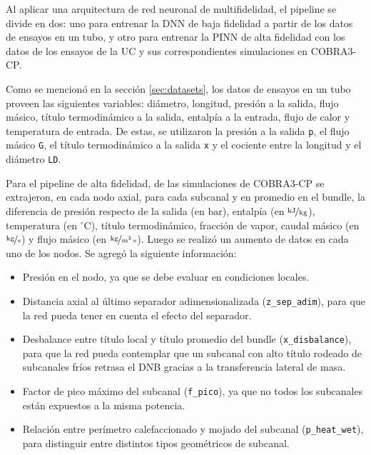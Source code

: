 Al aplicar una arquitectura de red neuronal de multifidelidad, el pipeline se divide en dos: uno para entrenar la DNN de baja fidelidad a partir de los datos de ensayos en un tubo, y otro para entrenar la PINN de alta fidelidad con los datos de los ensayos de la UC y sus correspondientes simulaciones en COBRA3-CP.

Como se mencionó en la sección \ref{sec:datasets}, los datos de ensayos en un tubo proveen las siguientes variables: diámetro, longitud, presión a la salida, flujo másico, título termodinámico a la salida, entalpía a la entrada, flujo de calor y temperatura de entrada. De estas, se utilizaron la presión a la salida \texttt{p}, el flujo másico \texttt{G}, el título termodinámico a la salida \texttt{x} y el cociente entre la longitud y el diámetro \texttt{LD}.

Para el pipeline de alta fidelidad, de las simulaciones de COBRA3-CP se extrajeron, en cada nodo axial, para cada subcanal y en promedio en el bundle, la diferencia de presión respecto de la salida (en $\mathrm{bar}$), entalpía (en $\nicefrac{\mathrm{kJ}}{\mathrm{kg}}$), temperatura (en $\mathrm{^\circ C}$), título termodinámico, fracción de vapor, caudal másico (en $\nicefrac{\mathrm{kg}}{\mathrm{s}}$) y flujo másico (en $\nicefrac{\mathrm{kg}}{\mathrm{m}^2\,\mathrm{s}}$). Luego se realizó un aumento de datos en cada uno de los nodos. Se agregó la siguiente información: 
\begin{itemize}
    \item Presión en el nodo, ya que se debe evaluar en condiciones locales.
    \item Distancia axial al último separador adimensionalizada (\texttt{z\_sep\_adim}), para que la red pueda tener en cuenta el efecto del separador.
    \item Desbalance entre título local y título promedio del bundle (\texttt{x\_disbalance}), para que la red pueda contemplar que un subcanal con alto título rodeado de subcanales fríos retrasa el DNB gracias a la transferencia lateral de masa.
    \item Factor de pico máximo del subcanal (\texttt{f\_pico}), ya que no todos los subcanales están expuestos a la misma potencia.
    \item Relación entre perímetro calefaccionado y mojado del subcanal (\texttt{p\_heat\allowbreak\_wet}), para distinguir entre distintos tipos geométricos de subcanal.
\end{itemize}


